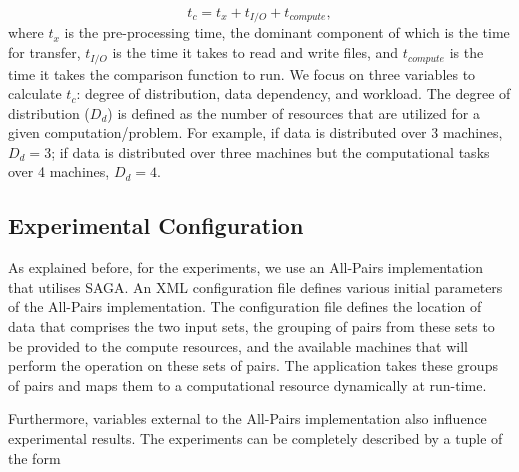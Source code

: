 \documentclass{rspublic}
\begin{document}
\vspace{-0.3cm}

 \begin{equation}
t_c = t_x + t_{I/O} + t_{compute},
\end{equation}
where $t_x$ is the pre-processing time, the dominant component of which is
the time for transfer, $t_{I/O}$ is the time it takes to read and write
files, and $t_{compute}$ is the time it takes the comparison function to
run. We focus on three variables to calculate $t_c$: degree of
distribution, data dependency, and workload. The degree of distribution
($D_d$) is defined as the number of resources that are utilized for a
given computation/problem. For example, if data is distributed over 3
machines, $D_d=3$; if data is distributed over three machines but the
computational tasks over 4 machines, $D_d=4$.

\vspace{-0.4cm}

\subsection{Experimental Configuration}

\vspace{-0.1cm}

As explained before, for the experiments, we use an All-Pairs
implementation that utilises SAGA. An XML configuration file defines
various initial parameters of the All-Pairs
implementation. The configuration file defines the location of data that
comprises the two input sets, the grouping of pairs from these sets to
be provided to the compute resources, and the available machines that
will perform the operation on these sets of pairs. The application takes
these groups of pairs and maps them to a computational resource
dynamically at run-time.

Furthermore, variables external to the All-Pairs implementation also
influence experimental results. The experiments can be completely
described by a tuple of the form

\vspace{-0.2cm}
\end{document}

